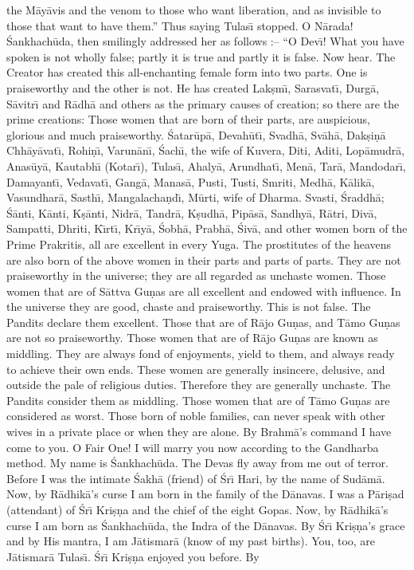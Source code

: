 the M\=ay\=avis and the venom to those who want liberation, and as invisible to those that want to have them.'' Thus saying Tulas\={\i} stopped. O N\=arada! \'Sankhach\=uda, then smilingly addressed her as follows :-- ``O Dev\={\i}! What you have spoken is not wholly false; partly it is true and partly it is false. Now hear. The Creator has created this all-enchanting female form into two parts. One is praiseworthy and the other is not. He has created Lak\d{s}m\={\i}, Sarasvat\={\i}, Durg\=a, S\=avitr\={\i} and R\=adh\=a and others as the primary causes of creation; so there are the prime creations: Those women that are born of their parts, are auspicious, glorious and much praiseworthy. \'Satar\=up\=a, Devah\=ut\={\i}, Svadh\=a, Sv\=ah\=a, Dak\d{s}i\d{n}\=a Chh\=ay\=avat\={\i}, Rohi\d{n}\={\i}, Varun\=an\={\i}, \'Sach\={\i}, the wife of Kuvera, Diti, Aditi, Lop\=amudr\=a, Anas\=uy\=a, Kautabh\={\i} (Kotar\={\i}), Tulas\={\i}, Ahaly\=a, Arundhat\={\i}, Men\=a, Tar\=a, Mandodar\={\i}, Damayant\={\i}, Vedavat\={\i}, Gang\=a, Manas\=a, Pusti, Tusti, Smriti, Medh\=a, K\=alik\=a, Vasundhar\=a, Sasth\={\i}, Mangalacha\d{n}d\={\i}, M\=urti, wife of Dharma. Svasti, \'Sraddh\=a; \'S\=anti, K\=anti, K\d{s}\=anti, Nidr\=a, Tandr\=a, K\d{s}udh\=a, Pip\=as\=a, Sandhy\=a, R\=atri, Div\=a, Sampatti, Dhriti, K\={\i}rt\={\i}, Kr\={\i}y\=a, \'Sobh\=a, Prabh\=a, \'Siv\=a, and other women born of the Prime Prakritis, all are excellent in every Yuga. The prostitutes of the heavens are also born of the above women in their parts and parts of parts. They are not praiseworthy in the universe; they are all regarded as unchaste women. Those women that are of S\=attva Gu\d{n}as are all excellent and endowed with influence. In the universe they are good, chaste and praiseworthy. This is not false. The Pandits declare them excellent. Those that are of R\=ajo Gu\d{n}as, and T\=amo Gu\d{n}as are not so praiseworthy. Those women that are of R\=ajo Gu\d{n}as are known as middling. They are always fond of enjoyments, yield to them, and always ready to achieve their own ends. These women are generally insincere, delusive, and outside the pale of religious duties. Therefore they are generally unchaste. The Pandits consider them as middling. Those women that are of T\=amo Gu\d{n}as are considered as worst. Those born of noble families, can never speak with other wives in a private place or when they are alone. By Brahm\=a's command I have come to you. O Fair One! I will marry you now according to the Gandharba method. My name is \'Sankhach\=uda. The Devas fly away from me out of terror. Before I was the intimate \'Sakh\=a (friend) of \'Sr\={\i} Hari, by the name of Sud\=am\=a. Now, by R\=adhik\=a's curse I am born in the family of the D\=anavas. I was a P\=ari\d{s}ad (attendant) of \'Sr\={\i} Kri\d{s}\d{n}a and the chief of the eight Gopas. Now, by R\=adhik\=a's curse I am born as \'Sankhach\=uda, the Indra of the D\=anavas. By \'Sr\={\i} Kri\d{s}\d{n}a's grace and by His mantra, I am J\=atismar\=a (know of my past births). You, too, are J\=atismar\=a Tulas\={\i}. \'Sr\={\i} Kri\d{s}\d{n}a enjoyed you before. By

